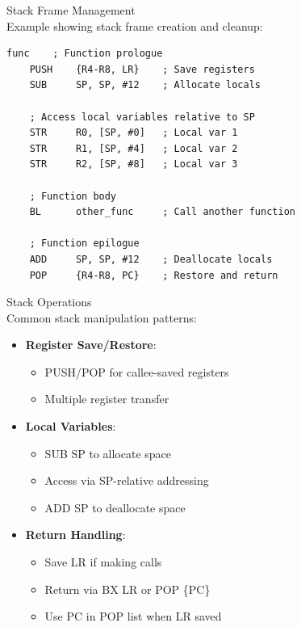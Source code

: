 \begin{example2}{Stack Frame Management}\\
Example showing stack frame creation and cleanup:

\begin{lstlisting}[language=armasm, style=basesmol]
func    ; Function prologue
    PUSH    {R4-R8, LR}    ; Save registers
    SUB     SP, SP, #12    ; Allocate locals
    
    ; Access local variables relative to SP
    STR     R0, [SP, #0]   ; Local var 1
    STR     R1, [SP, #4]   ; Local var 2
    STR     R2, [SP, #8]   ; Local var 3
    
    ; Function body
    BL      other_func     ; Call another function
    
    ; Function epilogue
    ADD     SP, SP, #12    ; Deallocate locals
    POP     {R4-R8, PC}    ; Restore and return
\end{lstlisting}
\end{example2}

\begin{concept}{Stack Operations}\\
Common stack manipulation patterns:
\begin{itemize}
  \item \textbf{Register Save/Restore}:
    \begin{itemize}
      \item PUSH/POP for callee-saved registers
      \item Multiple register transfer
    \end{itemize}
  \item \textbf{Local Variables}:
    \begin{itemize}
      \item SUB SP to allocate space
      \item Access via SP-relative addressing
      \item ADD SP to deallocate space
    \end{itemize}
  \item \textbf{Return Handling}:
    \begin{itemize}
      \item Save LR if making calls
      \item Return via BX LR or POP \{PC\}
      \item Use PC in POP list when LR saved
    \end{itemize}
\end{itemize}
\end{concept}

